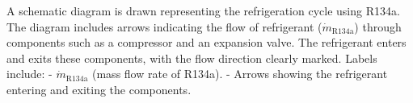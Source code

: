 A schematic diagram is drawn representing the refrigeration cycle using R134a. The diagram includes arrows indicating the flow of refrigerant (\( \dot{m}_{\text{R134a}} \)) through components such as a compressor and an expansion valve. The refrigerant enters and exits these components, with the flow direction clearly marked. Labels include:  
- \( \dot{m}_{\text{R134a}} \) (mass flow rate of R134a).  
- Arrows showing the refrigerant entering and exiting the components.